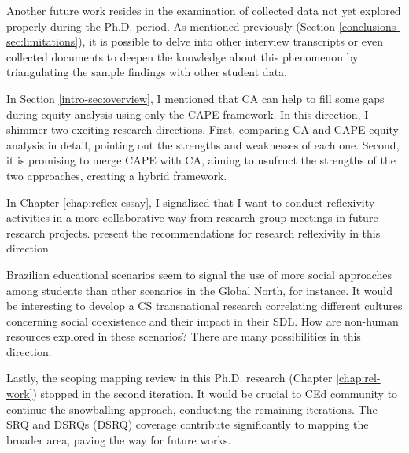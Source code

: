 Another future work resides in the examination of collected data not yet explored properly during the \gls{Ph.D.} period. As mentioned previously (Section \ref{conclusions-sec:limitations}), it is possible to delve into other interview transcripts or even collected documents to deepen the knowledge about this phenomenon by triangulating the sample findings with other student data. 

In Section \ref{intro-sec:overview}, I mentioned that \gls{CA} can help to fill some gaps during equity analysis using only the
\gls{CAPE} framework. In this direction, I shimmer two exciting research directions. First, comparing \gls{CA} and \gls{CAPE} equity analysis in detail, pointing out the strengths and weaknesses of each one. Second, it is promising to merge \gls{CAPE} with \gls{CA}, aiming to usufruct the strengths of the two approaches, creating a hybrid framework.

In Chapter \ref{chap:reflex-essay}, I signalized that I want to conduct reflexivity activities in a more collaborative way from research group meetings in future research projects.  present the recommendations for research reflexivity in this direction.

Brazilian educational scenarios seem to signal the use of more social approaches among students than other scenarios in the Global North, for instance. It would be interesting to develop a \gls{CS} transnational research correlating different cultures concerning social coexistence and their impact in their \gls{SDL}. How are non-human resources explored in these scenarios? There are many possibilities in this direction.

Lastly, the scoping mapping review in this \gls{Ph.D.} research (Chapter \ref{chap:rel-work}) stopped in the second iteration. It would be crucial to \gls{CEd} community to continue the snowballing approach, conducting the remaining iterations. The \acrfull{SRQ} and \acrlong{DSRQ}s (\acrshort{DSRQ}) coverage contribute significantly to mapping the broader area, paving the way for future works.



                

